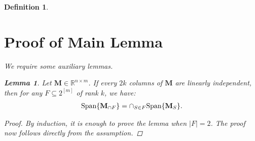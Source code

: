 \documentclass[9pt,twocolumn]{pnas-new}
\newtheorem{lemma}{Lemma}
\newtheorem{definition}{Definition}
\newtheorem{remark}{Remark}
\begin{document}
\begin{definition}

\showacknow %





\clearpage

\section{Proof of Main Lemma}

We require some auxiliary lemmas.

\begin{lemma}\label{SpanIntersectionLemma}
Let $\mathbf{M} \in \mathbb{R}^{n \times m}$. If every $2k$ columns of $\mathbf{M}$ are linearly independent, then for any $F \subseteq 2^{[m]}$ of rank $k$, we have:
\begin{align*}
\text{\rm Span}\{\mathbf{M}_{\cap F}\}  = \cap_{S \in F} \text{\rm Span}\{\mathbf{M}_S\}.
\end{align*}
\end{lemma}
\begin{proof}
By induction, it is enough to prove the lemma when $|F| = 2$. The proof now follows directly from the assumption.
\end{proof}


\end{definition}
\end{document}
